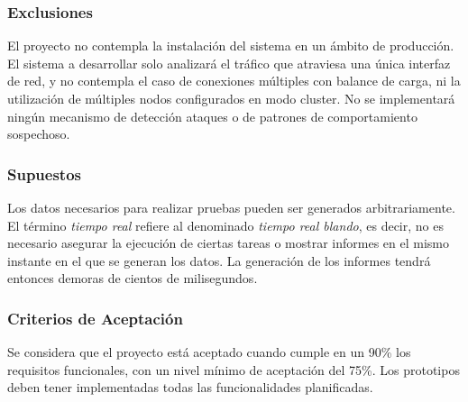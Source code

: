 \subsubsection{Exclusiones}
El proyecto no contempla la instalación del sistema en un ámbito de producción. El sistema a desarrollar solo analizará el tráfico que atraviesa una única interfaz de red, y no contempla el caso de conexiones múltiples con balance de carga, ni la utilización de múltiples nodos configurados en modo cluster. No se implementará ningún mecanismo de detección ataques o de patrones de comportamiento sospechoso.

\subsubsection{Supuestos}
Los datos necesarios para realizar pruebas pueden ser generados arbitrariamente.
El término \textit{tiempo real} refiere al denominado \textit{tiempo real blando}, es decir, no es necesario asegurar la ejecución de ciertas tareas o mostrar informes en el mismo instante en el que se generan los datos. La generación de los informes tendrá entonces demoras de cientos de milisegundos.

\subsubsection{Criterios de Aceptación}
Se considera que el proyecto está aceptado cuando cumple en un 90\% los requisitos funcionales, con un nivel mínimo de aceptación del 75\%. Los prototipos deben tener implementadas todas las funcionalidades planificadas.